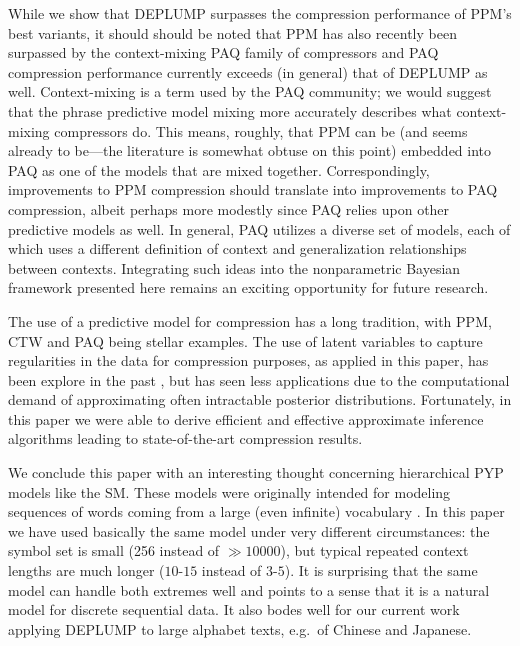 
While we show that DEPLUMP surpasses the compression performance of PPM's best
variants,  it should should be noted that PPM has
also recently been surpassed by the
context-mixing PAQ family of compressors \citep{mahoney:awc} and PAQ
compression performance currently exceeds (in general) that of DEPLUMP as well.
Context-mixing is a term used by the PAQ community; we would suggest that the
phrase predictive model mixing more accurately describes what context-mixing
compressors do.  This means, roughly, that PPM can be (and seems already to be---the literature is somewhat obtuse on this point) embedded into PAQ as one
of the models that are mixed together.  Correspondingly, improvements to PPM
compression should translate into improvements to PAQ compression, albeit
perhaps more modestly since PAQ relies upon other predictive models as well.  In general, PAQ utilizes a diverse set of models, each of which uses a
different definition of context and generalization relationships between
contexts. 
Integrating such ideas into the nonparametric Bayesian framework presented
here remains an exciting opportunity for future
research. 

The use of a predictive model for compression has a long tradition, with PPM,
CTW and PAQ being stellar examples.  The use of latent variables to capture
regularities in the data for compression purposes, as applied in this paper,
has been explore in the past \citep{hinton1994amd}, but has seen less
applications due to the computational demand of approximating often intractable
posterior distributions.   Fortunately, in this paper we were able to derive
efficient and effective approximate inference algorithms leading to
state-of-the-art compression results.

We conclude this paper with an interesting thought concerning hierarchical PYP
models like the SM.  These models were originally intended for modeling
sequences of words coming from a large (even infinite) vocabulary
\citep{Teh:ACL06}.  In this paper we have used basically the same model under
very different circumstances: the symbol set is small (256
instead of $\gg 10000$), but typical repeated context lengths are much longer
($10$-$15$ instead of $3$-$5$).  It is surprising that the same model can
handle both extremes well and points to a sense that it is a natural model for
discrete sequential data.  It also bodes well for our current work applying
DEPLUMP to large alphabet texts, e.g.\ of Chinese and Japanese.
